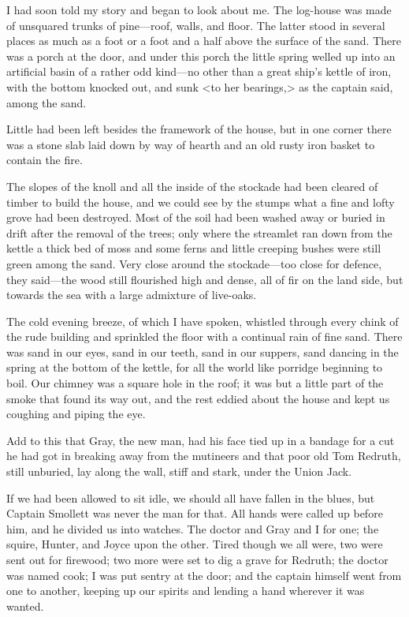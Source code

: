 I had soon told my story and began to look about me. The log-house was made of unsquared trunks of pine—roof, walls, and floor. The latter stood in several places as much as a foot or a foot and a half above the surface of the sand. There was a porch at the door, and under this porch the little spring welled up into an artificial basin of a rather odd kind—no other than a great ship's kettle of iron, with the bottom knocked out, and sunk <to her bearings,> as the captain said, among the sand.

Little had been left besides the framework of the house, but in one corner there was a stone slab laid down by way of hearth and an old rusty iron basket to contain the fire.

The slopes of the knoll and all the inside of the stockade had been cleared of timber to build the house, and we could see by the stumps what a fine and lofty grove had been destroyed. Most of the soil had been washed away or buried in drift after the removal of the trees; only where the streamlet ran down from the kettle a thick bed of moss and some ferns and little creeping bushes were still green among the sand. Very close around the stockade—too close for defence, they said—the wood still flourished high and dense, all of fir on the land side, but towards the sea with a large admixture of live-oaks.

The cold evening breeze, of which I have spoken, whistled through every chink of the rude building and sprinkled the floor with a continual rain of fine sand. There was sand in our eyes, sand in our teeth, sand in our suppers, sand dancing in the spring at the bottom of the kettle, for all the world like porridge beginning to boil. Our chimney was a square hole in the roof; it was but a little part of the smoke that found its way out, and the rest eddied about the house and kept us coughing and piping the eye.

Add to this that Gray, the new man, had his face tied up in a bandage for a cut he had got in breaking away from the mutineers and that poor old Tom Redruth, still unburied, lay along the wall, stiff and stark, under the Union Jack.

If we had been allowed to sit idle, we should all have fallen in the blues, but Captain Smollett was never the man for that. All hands were called up before him, and he divided us into watches. The doctor and Gray and I for one; the squire, Hunter, and Joyce upon the other. Tired though we all were, two were sent out for firewood; two more were set to dig a grave for Redruth; the doctor was named cook; I was put sentry at the door; and the captain himself went from one to another, keeping up our spirits and lending a hand wherever it was wanted.

